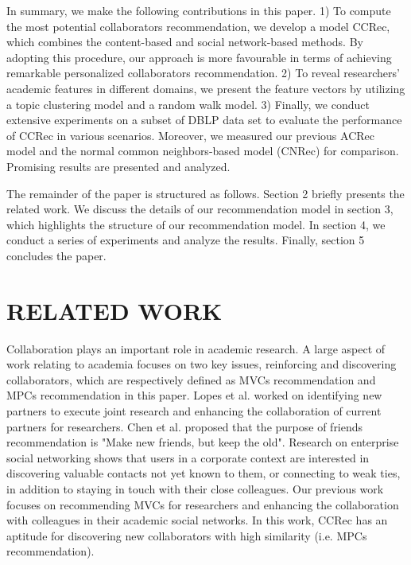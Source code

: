 \documentclass[10pt]{article}
\begin{document}
In summary, we make the following contributions in this paper. 1) To compute the most potential collaborators recommendation, we develop a model CCRec, which combines the content-based and social network-based methods. By adopting this procedure, our approach is more favourable in terms of achieving remarkable personalized collaborators recommendation. 2) To reveal researchers' academic features in different domains, we present the feature vectors by utilizing a topic clustering model and a random walk model. 3) Finally, we conduct extensive experiments on a subset of DBLP data set to evaluate the performance of CCRec in various scenarios. Moreover, we measured our previous ACRec model and the normal common neighbors-based model (CNRec) for comparison. Promising results are presented and analyzed.

The remainder of the paper is structured as follows. Section 2 briefly presents the related work. We discuss the details of our recommendation model in section 3, which highlights the structure of our recommendation model. In section 4, we conduct a series of experiments and analyze the results. Finally, section 5 concludes the paper.

\section*{RELATED WORK}
Collaboration plays an important role in academic research. A large aspect of work relating to academia focuses on two key issues, reinforcing and discovering collaborators, which are respectively defined as MVCs recommendation and MPCs recommendation in this paper. Lopes et al. \cite{lopes2010collaboration} worked on identifying new partners to execute joint research and enhancing the collaboration of current partners for researchers. Chen et al. \cite{chen2009make} proposed that the purpose of friends recommendation is "Make new friends, but keep the old". Research on enterprise social networking \cite{dimicco2008motivations} shows that users in a corporate context are interested in discovering valuable contacts not yet known to them, or connecting to weak ties, in addition to staying in touch with their close colleagues. Our previous work \cite{li2014acrec,xia2014mvcwalker} focuses on recommending MVCs for researchers and enhancing the collaboration with colleagues in their academic social networks. In this work, CCRec has an aptitude for discovering new collaborators with high similarity (i.e. MPCs recommendation).
\end{document}
